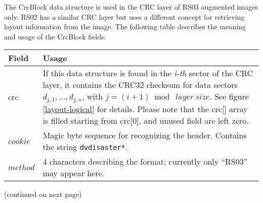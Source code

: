 \bigskip

The CrcBlock data structure is used in the CRC layer of RS03 augmented images
only. RS02 has a similar CRC layer but uses a different concept for retrieving
layout information from the image. The following table describes the meaning
and usage of the CrcBlock fields:
\medskip

\begin{tabular}{|l|p{12cm}|}
\hline
Field & Usage \\
\hline 
crc & If this data structure is found in the {\em i-th} sector of the CRC layer,
it contains the CRC32 checksum for data sectors $d_{j,1}, \ldots, d_{j,n}$, with
$j = (i+1) \bmod\ layer\ size$. See figure \ref{layout-logical} for details.
Please note that the crc[] array is filled starting from crc[0], and unused field
are left zero. \\
\hline
$cookie$ & Magic byte sequence for recognizing the header.\newline
Contains the string {\tt *dvdisaster*}. \\
\hline
$method$ & 4 characters describing the format; currently only ``RS03''
may appear here.\\
\hline
\end{tabular}

{\footnotesize (continued on next page)}
\vfill
\newpage

